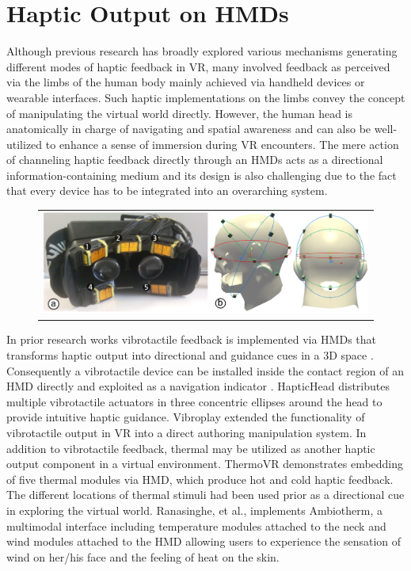 \section{Haptic Output on HMDs }
Although previous research has broadly explored various mechanisms generating different modes of haptic feedback in VR, many involved feedback as perceived via the limbs of the human body mainly achieved via handheld devices or wearable interfaces. Such haptic implementations on the limbs convey the concept of manipulating the virtual world directly. However, the human head is anatomically in charge of navigating and spatial awareness and can also be well-utilized to enhance a sense of immersion during VR encounters. The mere action of channeling haptic feedback directly through an HMDs acts as a directional information-containing medium and its design is also challenging due to the fact that every device has to be integrated into an overarching system.

\begin{figure}[h]
    \begin{center}
        \begin{tabular}{@{\hspace{0.1cm}}c}
           \includegraphics[width=1\textwidth]		{figures/Head_RelatedWork.pdf}
        \end{tabular}
        \label{fig:Head_RelatedWork}
    \end{center}
\end{figure}

In prior research works vibrotactile feedback is implemented via HMDs that transforms haptic output into directional and guidance cues in a 3D space \cite{VibGuide, HapticHead, Vibroplay}. Consequently a vibrotactile device can be installed inside the contact region of an HMD directly and exploited as a navigation indicator \cite{VibGuide}. HapticHead \cite{HapticHead} distributes multiple vibrotactile actuators in three concentric ellipses around the head to provide intuitive haptic guidance. Vibroplay \cite{Vibroplay} extended the functionality of vibrotactile output in VR into a direct authoring manipulation system. In addition to vibrotactile feedback, thermal may be utilized as another haptic output component in a virtual environment. ThermoVR \cite{ThermoVR} demonstrates embedding of five thermal modules via HMD, which produce hot and cold haptic feedback. The different locations of thermal stimuli had been used prior as a directional cue in exploring the virtual world. Ranasinghe, et al., \cite{Ambiotherm} implements Ambiotherm, a multimodal interface including temperature modules attached to the neck and wind modules attached to the HMD allowing users to experience the sensation of wind on her/his face and the feeling of heat on the skin. 

